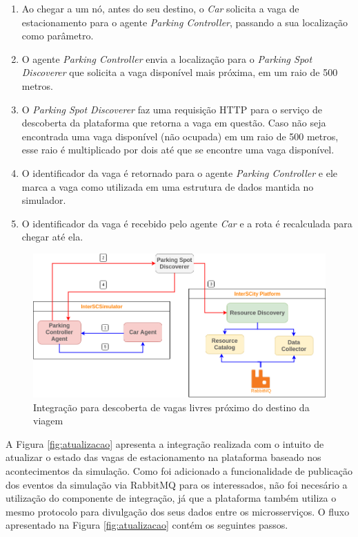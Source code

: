 \begin{enumerate}
    \item Ao chegar a um nó, antes do seu destino, o \textit{Car} solicita a vaga de estacionamento para o agente \textit{Parking Controller}, passando a sua
	localização como parâmetro.

	\item O agente \textit{Parking Controller} envia a localização para o \textit{Parking Spot Discoverer} que solicita a vaga disponível mais próxima,
	em um raio de 500 metros.

	\item O \textit{Parking Spot Discoverer} faz uma requisição HTTP para o serviço de descoberta da plataforma que retorna a vaga em questão.
	Caso não seja encontrada uma vaga disponível (não ocupada) em um raio de 500 metros, esse raio é multiplicado por dois até que se encontre uma vaga
	disponível.

	\item O identificador da vaga é retornado para o agente \textit{Parking Controller} e ele marca a vaga como utilizada em uma estrutura de dados mantida no simulador.

    \item O identificador da vaga é recebido pelo agente \textit{Car} e a rota é recalculada para chegar até ela.
\end{enumerate}

\begin{figure}[ht]
	\centering
	\includegraphics[width=\textwidth]{figuras/integration_get_data_smart_parking.png}
	\caption{Integração para descoberta de vagas livres próximo do destino da
	viagem}
	\label{fig:descoberta}
\end{figure}

A Figura \ref{fig:atualizacao} apresenta a integração realizada com o intuito de atualizar o estado das vagas de estacionamento na plataforma baseado nos
acontecimentos da simulação.
Como foi adicionado a funcionalidade de publicação dos eventos da simulação via RabbitMQ para os interessados, não foi necesário a utilização do
componente de integração, já que a plataforma também utiliza o mesmo protocolo para divulgação dos seus dados entre os microsserviços.
O fluxo apresentado na Figura \ref{fig:atualizacao} contém os seguintes passos.

